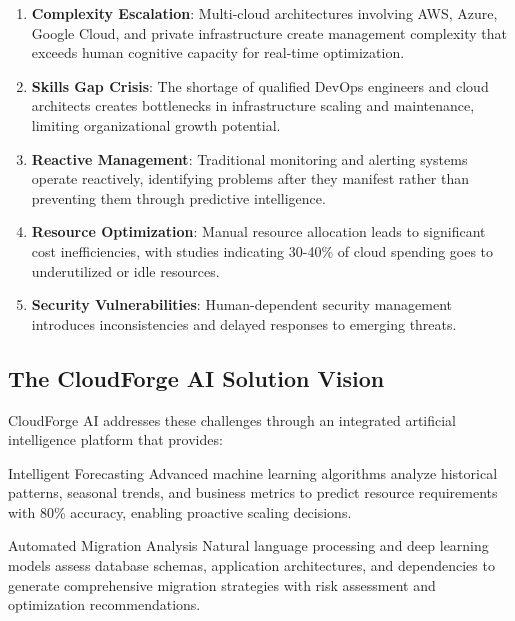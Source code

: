 \begin{enumerate}[leftmargin=*]
    \item \textbf{Complexity Escalation}: Multi-cloud architectures involving AWS, Azure, Google Cloud, and private infrastructure create management complexity that exceeds human cognitive capacity for real-time optimization.
    
    \item \textbf{Skills Gap Crisis}: The shortage of qualified DevOps engineers and cloud architects creates bottlenecks in infrastructure scaling and maintenance, limiting organizational growth potential.
    
    \item \textbf{Reactive Management}: Traditional monitoring and alerting systems operate reactively, identifying problems after they manifest rather than preventing them through predictive intelligence.
    
    \item \textbf{Resource Optimization}: Manual resource allocation leads to significant cost inefficiencies, with studies indicating 30-40\% of cloud spending goes to underutilized or idle resources.
    
    \item \textbf{Security Vulnerabilities}: Human-dependent security management introduces inconsistencies and delayed responses to emerging threats.
\end{enumerate}

\subsection{The CloudForge AI Solution Vision}

CloudForge AI addresses these challenges through an integrated artificial intelligence platform that provides:

\begin{featurebox}{Intelligent Forecasting}
Advanced machine learning algorithms analyze historical patterns, seasonal trends, and business metrics to predict resource requirements with 80\% accuracy, enabling proactive scaling decisions.
\end{featurebox}

\begin{featurebox}{Automated Migration Analysis}
Natural language processing and deep learning models assess database schemas, application architectures, and dependencies to generate comprehensive migration strategies with risk assessment and optimization recommendations.
\end{featurebox}

